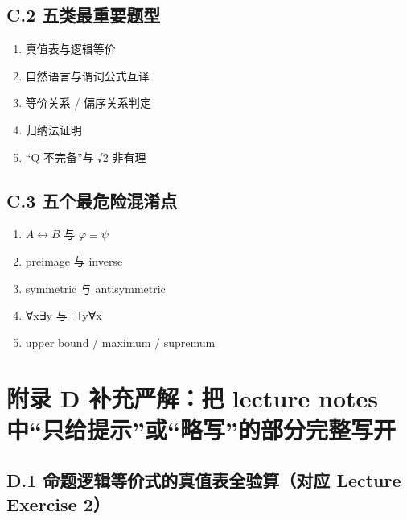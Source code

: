 \documentclass[
  11pt,
]{article}
\providecommand{\tightlist}{%
  \setlength{\itemsep}{0pt}\setlength{\parskip}{0pt}}
\begin{document}
\subsection{C.2
五类最重要题型}\label{c.2-ux4e94ux7c7bux6700ux91cdux8981ux9898ux578b}

\begin{enumerate}
\def\labelenumi{\arabic{enumi}.}
\tightlist
\item
  真值表与逻辑等价\\
\item
  自然语言与谓词公式互译\\
\item
  等价关系 / 偏序关系判定\\
\item
  归纳法证明\\
\item
  ``Q 不完备''与 √2 非有理
\end{enumerate}

\subsection{C.3
五个最危险混淆点}\label{c.3-ux4e94ux4e2aux6700ux5371ux9669ux6df7ux6dc6ux70b9}

\begin{enumerate}
\def\labelenumi{\arabic{enumi}.}
\tightlist
\item
  \(A\leftrightarrow B\) 与 \(\varphi\equiv\psi\)\\
\item
  preimage 与 inverse\\
\item
  symmetric 与 antisymmetric\\
\item
  ∀x∃y 与 ∃y∀x\\
\item
  upper bound / maximum / supremum
\end{enumerate}

\section{附录 D 补充严解：把 lecture notes
中``只给提示''或``略写''的部分完整写开}\label{ux9644ux5f55-d-ux8865ux5145ux4e25ux89e3ux628a-lecture-notes-ux4e2dux53eaux7ed9ux63d0ux793aux6216ux7565ux5199ux7684ux90e8ux5206ux5b8cux6574ux5199ux5f00}

\subsection{D.1 命题逻辑等价式的真值表全验算（对应 Lecture Exercise
2）}\label{d.1-ux547dux9898ux903bux8f91ux7b49ux4ef7ux5f0fux7684ux771fux503cux8868ux5168ux9a8cux7b97ux5bf9ux5e94-lecture-exercise-2}
\end{document}
